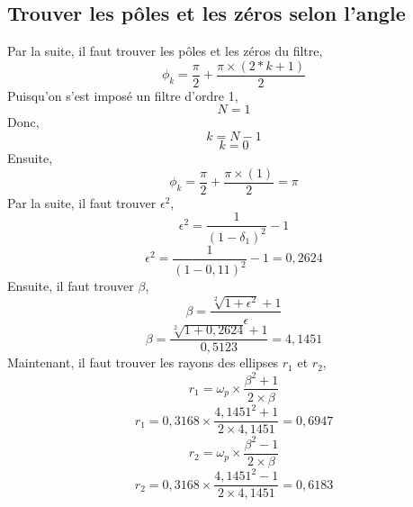 \documentclass{article}
\begin{document}
\subsection{Trouver les pôles et les zéros selon l'angle}
Par la suite, il faut trouver les pôles et les zéros du filtre,
\begin{equation}
\phi_k = \frac{\pi}{2} + \frac{\pi \times (2*k+1)}{2}
\end{equation}
Puisqu'on s'est imposé un filtre d'ordre 1,
\begin{equation}
N = 1
\end{equation}
Donc,
\begin{equation}
k = N - 1
\end{equation}
\begin{equation}
k = 0
\end{equation}
Ensuite,
\begin{equation}
\phi_k = \frac{\pi}{2} + \frac{\pi \times (1)}{2} = \pi
\end{equation}
\newline
Par la suite, il faut trouver $\epsilon^2$,
\begin{equation}
\epsilon^2 = \frac{1}{(1-\delta_1)^2}-1
\end{equation}
\begin{equation}
\epsilon^2 = \frac{1}{(1-0,11)^2}-1 = 0,2624
\end{equation}
Ensuite, il faut trouver $\beta$,
\begin{equation}
\beta = \frac{\sqrt[2]{1+\epsilon^2} + 1}{\epsilon}
\end{equation}
\begin{equation}
\beta = \frac{\sqrt[2]{1+0,2624} + 1}{0,5123}=4,1451
\end{equation}
Maintenant, il faut trouver les rayons des ellipses $r_1$ et $r_2$,
\begin{equation}
r_1 = \omega_p \times \frac{\beta^2 + 1}{2 \times \beta}
\end{equation}
\begin{equation}
r_1 = 0,3168 \times \frac{4,1451^2 + 1}{2 \times 4,1451} = 0,6947
\end{equation}
\begin{equation}
r_2 = \omega_p \times \frac{\beta^2 - 1}{2 \times \beta}
\end{equation}
\begin{equation}
r_2 = 0,3168 \times \frac{4,1451^2 - 1}{2 \times 4,1451} = 0,6183
\end{equation}
\newline
\end{document}
